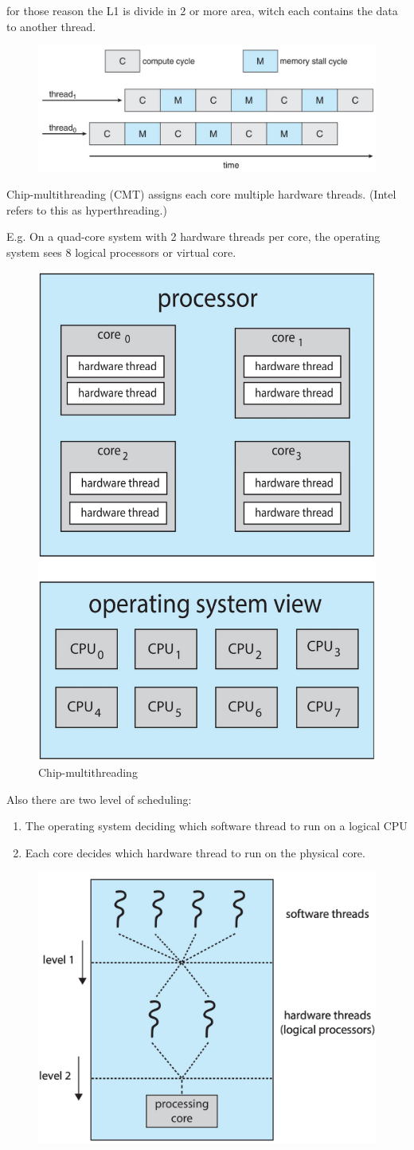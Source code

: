 for those reason the L1 is divide in 2 or more area, witch each contains the data to another thread.

\begin{figure}[htbp]
    \centering
    \includegraphics[width=0.6\linewidth]{img/memory_stall.png}   
    
\end{figure}

Chip-multithreading (CMT)
assigns each core multiple
hardware threads. (Intel refers
to this as hyperthreading.)

E.g. On a quad-core system with 2
hardware threads per core, the
operating system sees 8 logical
processors or virtual core.


\begin{figure}[htbp]
    \centering
    \includegraphics[width=0.35\linewidth]{img/hyperthreading.png}
    \caption{Chip-multithreading}    
\end{figure}

Also there are two level of scheduling:

\begin{enumerate}
    \item The operating system deciding which software thread to run on a logical CPU
    \item Each core decides which hardware thread to run on the physical core.
\end{enumerate}

\begin{figure}[htbp]
    \centering
    \includegraphics[width=0.5\linewidth]{img/level_thread.png}    
    
\end{figure}

